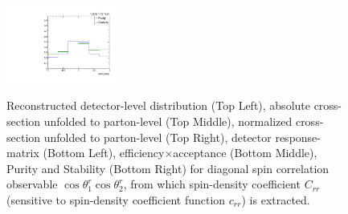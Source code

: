 \begin{figure}[htb]
\begin{center}
 \includegraphics[width=0.32\textwidth]{fig_fullRun2UL/unfolding/combined/PurStab_c_rr.pdf} \\
\caption{Reconstructed detector-level distribution (Top Left), absolute cross-section unfolded to parton-level (Top Middle), normalized cross-section unfolded to parton-level (Top Right), detector response-matrix (Bottom Left), efficiency$\times$acceptance (Bottom Middle), Purity and Stability (Bottom Right) for diagonal spin correlation observable $\cos\theta_{1}^{r}\cos\theta_{2}^{r}$, from which spin-density coefficient $C_{rr}$ (sensitive to spin-density coefficient function $c_{r r}$) is extracted.}
\label{fig:c_rr}
\end{center}
\end{figure}
\clearpage
